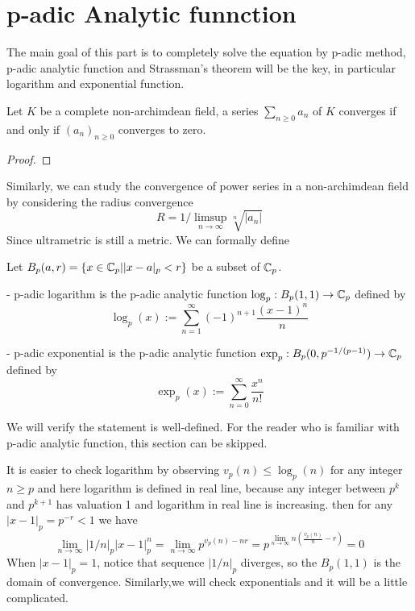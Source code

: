\section{p-adic Analytic funnction}

The main goal of this part is to completely solve the equation by p-adic method, p-adic analytic function and Strassman's theorem will be the key, in particular logarithm and exponential function. 

\begin{proposition}
    Let \(K\) be a complete non-archimdean field, a series \(\sum_{n \geq 0} a_n\) of \(K\) converges if and only if \((a_n)_{n \geq 0}\) converges to zero.

    \begin{proof}
        
    \end{proof}
\end{proposition}

Similarly, we can study the convergence of power series in a non-archimdean field by considering the radius convergence
\[R = 1/\limsup_{n \rightarrow \infty}\sqrt[n]{|a_n|}\]
Since ultrametric is still a metric. We can formally define 
\begin{definition}
    Let \(B_p(a,r) = \{x \in \mathbb{C}_p| |x-a|_p <r \}\) be a subset of \(\mathbb{C}_p\).

    - p-adic logarithm is the p-adic analytic function \(\log_p: B_p(1,1) \to \mathbb{C}_p\) defined by
    \[\log_p(x) := \sum_{n=1}^{\infty} (-1)^{n+1} \frac{(x-1)^n}{n}\]

    - p-adic exponential is the p-adic analytic function \(\exp_p : B_p(0,p^{-1/(p-1)}) \to \mathbb{C}_p\) defined by
    \[\exp_p (x) :=  \sum_{n=0}^{\infty} \frac{x^n}{n!}\]
\end{definition}

We will verify the statement is well-defined. For the reader who is familiar with p-adic analytic function, this section can be skipped. \newline 

It is easier to check logarithm by observing \(v_p(n) \leq \log_p(n)\) for any integer \(n \geq p\) and here logarithm is defined in real line, because any integer between \(p^k\) and \(p^{k+1}\) has valuation 1 and logarithm in real line is increasing. then for any \(|x-1|_p = p^{-r} < 1\) we have
\[ \lim_{n \rightarrow \infty} |1/n|_p |x-1|_p^n =\lim_{n \rightarrow \infty} p^{v_p(n)-nr} = p^{\lim_{n \rightarrow \infty}n(\frac{v_p(n)}{n}-r)} = 0\]
When \(|x-1|_p = 1\), notice that sequence \(|1/n|_p\) diverges, so the \(B_p(1,1)\) is the domain of convergence. Similarly,we will check exponentials and it will be a little complicated.

